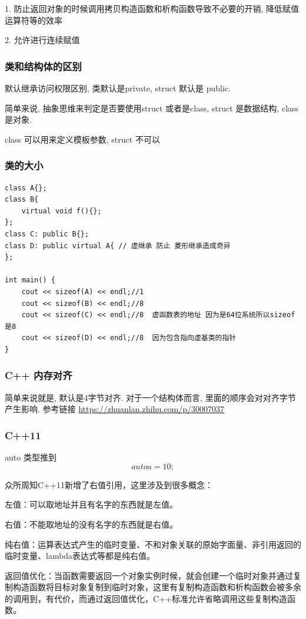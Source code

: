 \documentclass[UTF8]{ctexart}
\begin{document}
1. 防止返回对象的时候调用拷贝构造函数和析构函数导致不必要的开销, 降低赋值运算符等的效率

2. 允许进行连续赋值

\subsubsection{类和结构体的区别}

默认继承访问权限区别, 类默认是private, struct 默认是 public.

简单来说, 抽象思维来判定是否要使用struct 或者是class, struct 是数据结构, class 是对象.

class 可以用来定义模板参数, struct 不可以

\subsubsection{类的大小}

\begin{lstlisting}
class A{};
class B{
	virtual void f(){};
};
class C: public B{};
class D: public virtual A{ // 虚继承 防止 菱形继承造成奇异
};

int main() {
	cout << sizeof(A) << endl;//1
	cout << sizeof(B) << endl;//8
	cout << sizeof(C) << endl;//8  虚函数表的地址 因为是64位系统所以sizeof是8
	cout << sizeof(D) << endl;//8  因为包含指向虚基类的指针
}
\end{lstlisting}


\subsubsection{C++ 内存对齐}
简单来说就是, 默认是4字节对齐. 对于一个结构体而言, 里面的顺序会对对齐字节产生影响. 参考链接
\url{https://zhuanlan.zhihu.com/p/30007037}

\subsubsection{C++11}
auto 类型推到
$$
	auto a = 10;
$$

众所周知C++11新增了右值引用，这里涉及到很多概念：

左值：可以取地址并且有名字的东西就是左值。

右值：不能取地址的没有名字的东西就是右值。

纯右值：运算表达式产生的临时变量、不和对象关联的原始字面量、非引用返回的临时变量、lambda表达式等都是纯右值。

返回值优化：当函数需要返回一个对象实例时候，就会创建一个临时对象并通过复制构造函数将目标对象复制到临时对象，这里有复制构造函数和析构函数会被多余的调用到，有代价，而通过返回值优化，C++标准允许省略调用这些复制构造函数。
\end{document}
